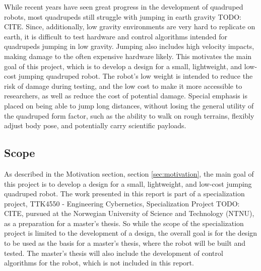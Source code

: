 While recent years have seen great progress in the development of quadruped robots, most quadrupeds still struggle with jumping in earth gravity TODO: CITE. Since, additionally, low gravity environments are very hard to replicate on earth, it is difficult to test hardware and control algorithms intended for quadrupeds jumping in low gravity. Jumping also includes high velocity impacts, making damage to the often expensive hardware likely. This motivates the main goal of this project, which is to develop a design for a small, lightweight, and low-cost jumping quadruped robot. The robot's low weight is intended to reduce the risk of damage during testing, and the low cost to make it more accessible to researchers, as well as reduce the cost of potential damage. Special emphasis is placed on being able to jump long distances, without losing the general utility of the quadruped form factor, such as the ability to walk on rough terrains, flexibly adjust body pose, and potentially carry scientific payloads.

\subsection{Scope}
\label{sec:scope}

As described in the Motivation section, section \ref{sec:motivation}, the main goal of this project is to develop a design for a small, lightweight, and low-cost jumping quadruped robot. The work presented in this report is part of a specialization project, TTK4550 - Engineering Cybernetics, Specialization Project TODO: CITE, pursued at the Norwegian University of Science and Technology (NTNU), as a preparation for a master's thesis. So while the scope of the specialization project is limited to the development of a design, the overall goal is for the design to be used as the basis for a master's thesis, where the robot will be built and tested. The master's thesis will also include the development of control algorithms for the robot, which is not included in this report.

